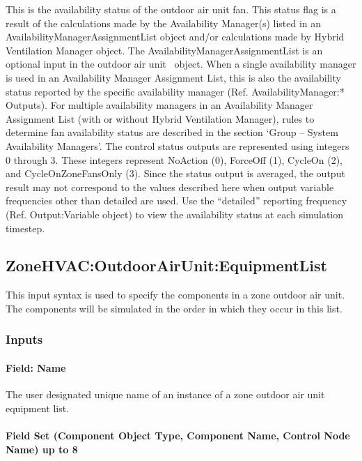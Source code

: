 This is the availability status of the outdoor air unit fan. This status flag is a result of the calculations made by the Availability Manager(s) listed in an AvailabilityManagerAssignmentList object and/or calculations made by Hybrid Ventilation Manager object. The AvailabilityManagerAssignmentList is an optional input in the outdoor air unit~ object. When a single availability manager is used in an Availability Manager Assignment List, this is also the availability status reported by the specific availability manager (Ref. AvailabilityManager:* Outputs). For multiple availability managers in an Availability Manager Assignment List (with or without Hybrid Ventilation Manager), rules to determine fan availability status are described in the section `Group -- System Availability Managers'. The control status outputs are represented using integers 0 through 3. These integers represent NoAction (0), ForceOff (1), CycleOn (2), and CycleOnZoneFansOnly (3). Since the status output is averaged, the output result may not correspond to the values described here when output variable frequencies other than detailed are used. Use the ``detailed'' reporting frequency (Ref. Output:Variable object) to view the availability status at each simulation timestep.

\subsection{ZoneHVAC:OutdoorAirUnit:EquipmentList}\label{zonehvacoutdoorairunitequipmentlist}

This input syntax is used to specify the components in a zone outdoor air unit. The components will be simulated in the order in which they occur in this list.

\subsubsection{Inputs}\label{inputs-6-032}

\paragraph{Field: Name}\label{field-name-6-027}

The user designated unique name of an instance of a zone outdoor air unit equipment list.

\paragraph{Field Set (Component Object Type, Component Name, Control Node Name) up to 8}\label{field-set-component-object-type-component-name-control-node-name-up-to-8}

